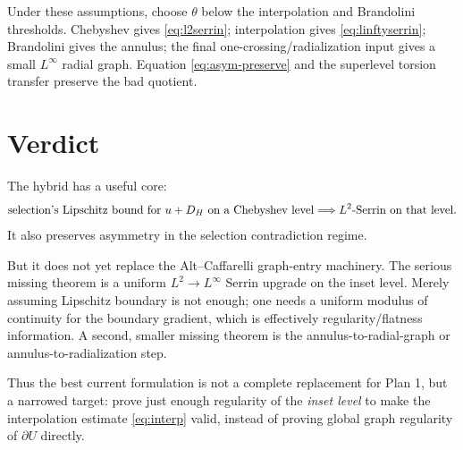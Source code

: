 \documentclass[11pt]{article}
\begin{document}
Under these assumptions, choose \(\theta\) below the interpolation and
Brandolini thresholds.  Chebyshev gives \eqref{eq:l2serrin}; interpolation
gives \eqref{eq:linftyserrin}; Brandolini gives the annulus; the final
one-crossing/radialization input gives a small \(L^\infty\) radial graph.
Equation \eqref{eq:asym-preserve} and the superlevel torsion transfer preserve
the bad quotient.

\section{Verdict}

The hybrid has a useful core:
\[
   \hbox{selection's Lipschitz bound for }u
   +D_H\hbox{ on a Chebyshev level}
   \Longrightarrow
   L^2\hbox{-Serrin on that level.}
\]
It also preserves asymmetry in the selection contradiction regime.

But it does not yet replace the Alt--Caffarelli graph-entry machinery.  The
serious missing theorem is a uniform \(L^2\to L^\infty\) Serrin upgrade on the
inset level.  Merely assuming Lipschitz boundary is not enough; one needs a
uniform modulus of continuity for the boundary gradient, which is effectively
regularity/flatness information.  A second, smaller missing theorem is the
annulus-to-radial-graph or annulus-to-radialization step.

Thus the best current formulation is not a complete replacement for Plan 1,
but a narrowed target: prove just enough regularity of the \emph{inset level}
to make the interpolation estimate \eqref{eq:interp} valid, instead of proving
global graph regularity of \(\partial U\) directly.
\end{document}
